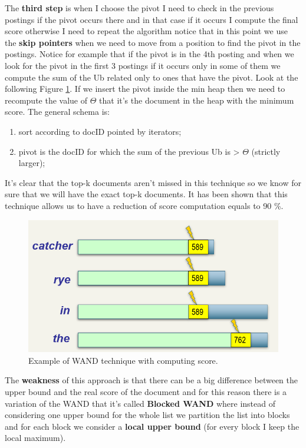 The \textbf{third step} is when I choose the pivot I need to check in the previous postings if the pivot occurs there and in that case if it occurs I compute the final score otherwise I need to repeat the algorithm notice that in this point we use the \textbf{skip pointers} when we need to move from a position to find the pivot in the postings. Notice for example that if the pivot is in the 4th posting and when we look for the pivot in the first 3 postings if it occurs only in some of them we compute the sum of the Ub related only to ones that have the pivot. Look at the following Figure \ref{fig:wand5}.\newline
If we insert the pivot inside the min heap then we need to recompute the value of $\Theta$ that it's the document in the heap with the minimum score.\newline
The general schema is:
\begin{enumerate}
    \item sort according to docID pointed by iterators;
    \item pivot is the docID for which the sum of the previous Ub is > $\Theta$ (strictly larger);
\end{enumerate}
It's clear that the top-k documents aren't missed in this technique so we know for sure that we will have the exact top-k documents. It has been shown that this technique allows us to have a reduction of score computation equals to 90 \%.\newline
\begin{figure}
    \centering
    \includegraphics[width=0.75\linewidth]{images/wand5.PNG}
    \caption{Example of WAND technique with computing score.}
    \label{fig:wand5}
\end{figure}
The \textbf{weakness} of this approach is that there can be a big difference between the upper bound and the real score of the document and for this reason there is a variation of the WAND that it's called \textbf{Blocked WAND} where instead of considering one upper bound for the whole list we partition the list into blocks and for each block we consider a \textbf{local upper bound} (for every block I keep the local maximum).\newline
